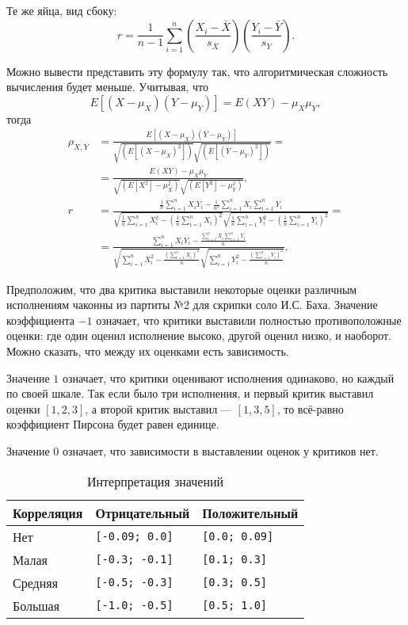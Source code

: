 Те же яйца, вид сбоку:
\[
r = \frac{1}{n - 1} \sum_{i = 1}^n \left( \frac{X_i - \bar{X}}{s_X} \right) \left( \frac{Y_i - \bar{Y}}{s_Y} \right).
\]

Можно вывести представить эту формулу так, что алгоритмическая сложность вычисления будет меньше. Учитывая, что
\[
E[(X - \mu_X)(Y - \mu_Y)] = E(XY) - \mu_X \mu_Y,
\]
тогда
\begin{align*}
\rho_{X, Y} &= \frac{E[(X - \mu_X)(Y - \mu_Y)]}{\sqrt{(E[(X - \mu_X)^2])} \sqrt{(E[(Y - \mu_Y)^2])}} = \\
  &= \frac{E(XY) - \mu_X \mu_Y}{\sqrt{(E[X^2] - \mu_X^2)} \sqrt{(E[Y^2] - \mu_Y^2)}}. \\
r &= \frac{\frac{1}{n} \sum_{i = 1}^n{X_i Y_i} - \frac{1}{n^2} \sum_{i = 1}^n{X_i} \sum_{i = 1}^n{Y_i}}{\sqrt{\frac{1}{n}\sum_{i = 1}^n{X_i^2} - (\frac{1}{n}\sum_{i = 1}^n{X_i})^2} \sqrt{\frac{1}{n}\sum_{i = 1}^n{Y_i^2} - (\frac{1}{n}\sum_{i = 1}^n{Y_i})^2}} = \\
  &= \frac{\sum_{i = 1}^n{X_i Y_i} - \frac{\sum_{i = 1}^n{X_i} \sum_{i = 1}^n{Y_i}}{n}}{\sqrt{\sum_{i = 1}^n{X_i^2} - \frac{\left(\sum_{i = 1}^n{X_i}\right)^2}{n}} \sqrt{\sum_{i = 1}^n{Y_i^2} - \frac{\left(\sum_{i = 1}^n{Y_i}\right)^2}{n}}}.
\end{align*}

Предположим, что два критика выставили некоторые оценки различным исполнениям чаконны из партиты №2 для скрипки соло И.С. Баха. Значение коэффициента \(-1\) означает, что критики выставили полностью противоположные оценки: где один оценил исполнение высоко, другой оценил низко, и наоборот. Можно сказать, что между их оценками есть зависимость.

Значение \(1\) означает, что критики оценивают исполнения одинаково, но каждый по своей шкале. Так если было три исполнения, и первый критик выставил оценки \([1, 2, 3]\), а второй критик выставил — \([1, 3, 5]\), то всё-равно коэффициент Пирсона будет равен единице.

Значение \(0\) означает, что зависимости в выставлении оценок у критиков нет.
\begin{table}[h!]
  \caption{Интерпретация значений}
  \begin{center}
    \begin{tabular}{lll}
      \toprule
      \textbf{Корреляция} & \textbf{Отрицательный} & \textbf{Положительный} \\
      \midrule
      Нет     & \texttt{[-0.09; 0.0]} & \texttt{[0.0; 0.09]} \\
      Малая   & \texttt{[-0.3; -0.1]} & \texttt{[0.1; 0.3]} \\
      Средняя & \texttt{[-0.5; -0.3]} & \texttt{[0.3; 0.5]} \\
      Большая & \texttt{[-1.0; -0.5]} & \texttt{[0.5; 1.0]} \\
      \bottomrule
    \end{tabular}
  \end{center}
\end{table}

